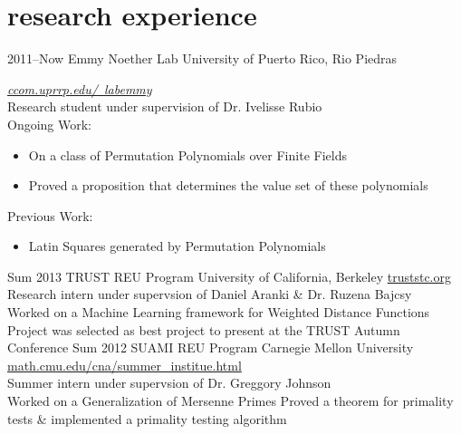 \documentclass[]{friggeri-cv}
\begin{document}

\section{research experience}

\begin{entrylist}
\entry
{2011--Now}
{Emmy Noether Lab}
{University of Puerto Rico, Rio Piedras}
{\emph{\href{http://ccom.uprrp.edu/~labemmy}{ccom.uprrp.edu/~labemmy}} \\
Research student under supervision of Dr. Ivelisse Rubio \\
Ongoing Work:
\begin{itemize}
\item On a class of Permutation Polynomials over Finite Fields
\item Proved a proposition that determines the value set of these polynomials
\end{itemize}
Previous Work:
\begin{itemize}
\item Latin Squares generated by Permutation Polynomials
\end{itemize}}
\entry
{Sum 2013}
{TRUST REU Program}
{University of California, Berkeley}
{\href{https://www.truststc.org/education/reu/13/index.html}{truststc.org} \\
Research intern under supervsion of Daniel Aranki \& Dr. Ruzena Bajcsy \\
Worked on a Machine Learning framework for Weighted Distance Functions
Project was selected as best project to present at the TRUST Autumn Conference}
\entry
{Sum 2012}
{SUAMI REU Program}
{Carnegie Mellon University}
{\href{http://www.math.cmu.edu/cna/summer_institute.html}{math.cmu.edu/cna/summer\_institue.html} \\
Summer intern under supervsion of Dr. Greggory Johnson\\
Worked on a Generalization of Mersenne Primes
Proved a theorem for primality tests \& implemented a primality testing algorithm}
\end{entrylist}

\end{document}
